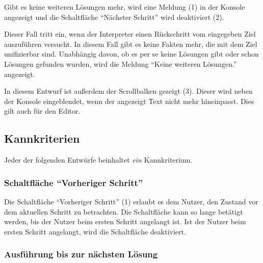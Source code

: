 \documentclass[parskip=full,11pt,twoside]{scrartcl}
\begin{document}
Gibt es keine weiteren Lösungen mehr, wird eine Meldung (1) in der Konsole angezeigt und die Schaltfläche \enquote{Nächster Schritt} wird deaktiviert (2).

Dieser Fall tritt ein, wenn der Interpreter einen Rückschritt vom eingegeben Ziel auszuführen versucht.
In diesem Fall gibt es keine Fakten mehr, die mit dem Ziel unifizierbar sind.
Unabhängig davon, ob es per se keine Lösungen gibt oder schon Lösungen gefunden wurden, wird die Meldung \enquote{Keine weiteren Lösungen.} angezeigt.

In diesem Entwurf ist außerdem der Scrollbalken gezeigt (3).
Dieser wird neben der Konsole eingeblendet, wenn der angezeigt Text nicht mehr hineinpasst.
Dies gilt auch für den Editor.

\subsection{Kannkriterien}

Jeder der folgenden Entwürfe beinhaltet \emph{ein} Kannkriterium.

\subsubsection{Schaltfläche \enquote{Vorheriger Schritt}}

\begin{minipage}{\linewidth}
\end{minipage}

\begin{minipage}{\linewidth}
\end{minipage}

Die Schaltfläche \enquote{Vorheriger Schritt} (1) erlaubt es dem Nutzer, den Zustand vor dem aktuellen Schritt zu betrachten.
Die Schaltfläche kann so lange betätigt werden, bis der Nutzer beim ersten Schritt angelangt ist.
Ist der Nutzer beim ersten Schritt angelangt, wird die Schaltfläche deaktiviert.

\subsubsection{Ausführung bis zur nächsten Lösung}
\end{document}
